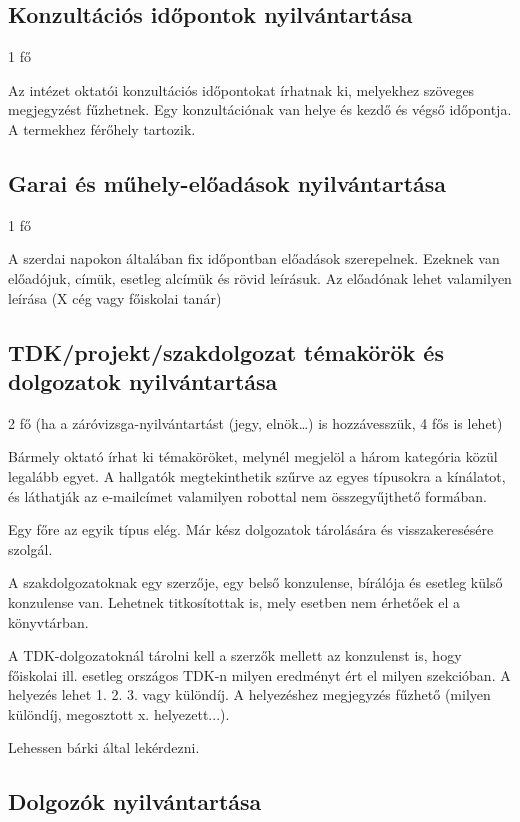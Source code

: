 \documentclass[a4paper]{article}
\begin{document}
\subsection{Konzultációs időpontok nyilvántartása}

1 fő

Az intézet oktatói konzultációs időpontokat írhatnak ki, melyekhez
szöveges megjegyzést fűzhetnek. Egy konzultációnak van helye és kezdő és
végső időpontja. A termekhez férőhely tartozik.

\subsection{Garai és műhely-előadások nyilvántartása}

1 fő

A szerdai napokon általában fix időpontban előadások szerepelnek.
Ezeknek van előadójuk, címük, esetleg alcímük és rövid leírásuk. Az
előadónak lehet valamilyen leírása (X cég vagy
főiskolai tanár)

\subsection{TDK/projekt/szakdolgozat témakörök és dolgozatok nyilvántartása}

2 fő (ha a záróvizsga-nyilvántartást (jegy, elnök\ldots) is hozzávesszük, 4 fős is lehet)

Bármely oktató írhat ki témaköröket, melynél megjelöl a három
kategória közül legalább egyet. A hallgatók megtekinthetik szűrve az
egyes típusokra a kínálatot, és láthatják az e-mailcímet valamilyen
robottal nem összegyűjthető formában.

Egy főre az egyik típus elég.
Már kész dolgozatok tárolására és visszakeresésére szolgál.

A szakdolgozatoknak egy szerzője, egy belső konzulense, bírálója és
esetleg külső konzulense van. Lehetnek titkosítottak is, mely esetben
nem érhetőek el a könyvtárban.

A TDK-dolgozatoknál tárolni kell a szerzők mellett az konzulenst is, hogy
főiskolai ill. esetleg országos TDK-n milyen eredményt ért el milyen
szekcióban. A helyezés lehet 1. 2. 3. vagy különdíj. A helyezéshez
megjegyzés fűzhető (milyen különdíj, megosztott x. helyezett...).

Lehessen bárki által lekérdezni.

\subsection{Dolgozók nyilvántartása}
\end{document}
